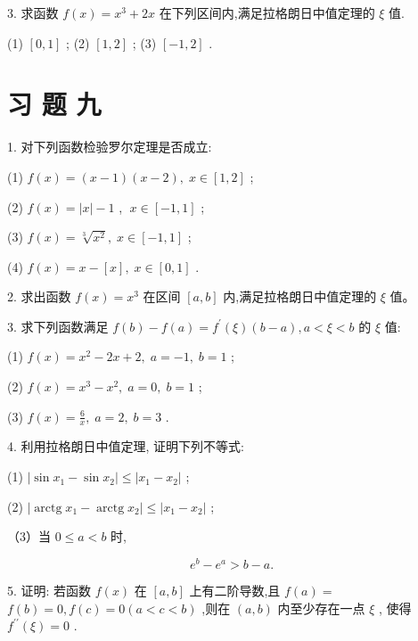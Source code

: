 \documentclass[10pt]{article}
\begin{document}
3. 求函数 \(f\left( x\right) = {x}^{3} + {2x}\) 在下列区间内,满足拉格朗日中值定理的 \(\xi\) 值.

(1) \(\left\lbrack {0,1}\right\rbrack\) ; (2) \(\left\lbrack {1,2}\right\rbrack\) ; (3) \(\left\lbrack {-1,2}\right\rbrack\) .

\section*{习 题 九}

1. 对下列函数检验罗尔定理是否成立:

(1) \(f\left( x\right) = \left( {x - 1}\right) \left( {x - 2}\right) ,\;x \in \left\lbrack {1,2}\right\rbrack\) ;

(2) \(f\left( x\right) = \left| x\right| - 1\) , \(\;x \in \left\lbrack {-1,1}\right\rbrack\) ;

(3) \(f\left( x\right) = \sqrt[3]{{x}^{2}},\;x \in \left\lbrack {-1,1}\right\rbrack\) ;

(4) \(f\left( x\right) = x - \left\lbrack x\right\rbrack ,\;x \in \left\lbrack {0,1}\right\rbrack\) .

2. 求出函数 \(f\left( x\right) = {x}^{3}\) 在区间 \(\left\lbrack {a,b}\right\rbrack\) 内,满足拉格朗日中值定理的 \(\xi\) 值。

3. 求下列函数满足 \(f\left( b\right) - f\left( a\right) = {f}^{\prime }\left( \xi \right) \left( {b - a}\right) ,a < \xi < b\) 的 \(\xi\) 值:

(1) \(f\left( x\right) = {x}^{2} - {2x} + 2,\;a = - 1,\;b = 1\) ;

(2) \(f\left( x\right) = {x}^{3} - {x}^{2},\;a = 0,\;b = 1\) ;

(3) \(f\left( x\right) = \frac{6}{x},\;a = 2,\;b = 3\) .

4. 利用拉格朗日中值定理, 证明下列不等式:

(1) \(\left| {\sin {x}_{1} - \sin {x}_{2}}\right| \leq \left| {{x}_{1} - {x}_{2}}\right|\) ;

(2) \(\left| {\operatorname{arctg}{x}_{1} - \operatorname{arctg}{x}_{2}}\right| \leq \left| {{x}_{1} - {x}_{2}}\right|\) ;

（3）当 \(0 \leq a < b\) 时,

\[
{e}^{b} - {e}^{a} > b - a.
\]

5. 证明: 若函数 \(f\left( x\right)\) 在 \(\left\lbrack {a,b}\right\rbrack\) 上有二阶导数,且 \(f\left( a\right) =\) \(f\left( b\right) = 0,f\left( c\right) = 0\left( {a < c < b}\right)\) ,则在 \(\left( {a,b}\right)\) 内至少存在一点 \(\xi\) , 使得 \({f}^{\prime \prime }\left( \xi \right) = 0\) .
\end{document}
